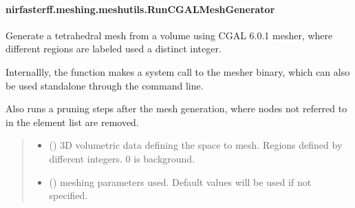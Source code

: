 \documentclass[letterpaper,10pt,english]{sphinxmanual}
\begin{document}
\sphinxstepscope


\paragraph{nirfasterff.meshing.meshutils.RunCGALMeshGenerator}
\label{\detokenize{_autosummary/nirfasterff.meshing.meshutils.RunCGALMeshGenerator:nirfasterff-meshing-meshutils-runcgalmeshgenerator}}\label{\detokenize{_autosummary/nirfasterff.meshing.meshutils.RunCGALMeshGenerator::doc}}

\begin{fulllineitems}
\label{\detokenize{_autosummary/nirfasterff.meshing.meshutils.RunCGALMeshGenerator:nirfasterff.meshing.meshutils.RunCGALMeshGenerator}}
\pysigstartsignatures
{}
\pysigstopsignatures
\sphinxAtStartPar
Generate a tetrahedral mesh from a volume using CGAL 6.0.1 mesher, where different regions are labeled used a distinct integer.

\sphinxAtStartPar
Internallly, the function makes a system call to the mesher binary, which can also be used standalone through the command line.

\sphinxAtStartPar
Also runs a pruning steps after the mesh generation, where nodes not referred to in the element list are removed.
\begin{quote}\begin{description}
\begin{itemize}
\item {} 
\sphinxAtStartPar
{} () \textendash{} 3D volumetric data defining the space to mesh. Regions defined by different integers. 0 is background.

\item {} 
\sphinxAtStartPar
{} ({\hyperref[\detokenize{_autosummary/nirfasterff.utils.MeshingParams:nirfasterff.utils.MeshingParams}]{}}\sphinxstyleliteralemphasis{\sphinxupquote{, }}) \textendash{} 
\sphinxAtStartPar
meshing parameters used. Default values will be used if not specified.


\end{itemize}
\end{description}
\end{quote}
\end{fulllineitems}
\end{document}
